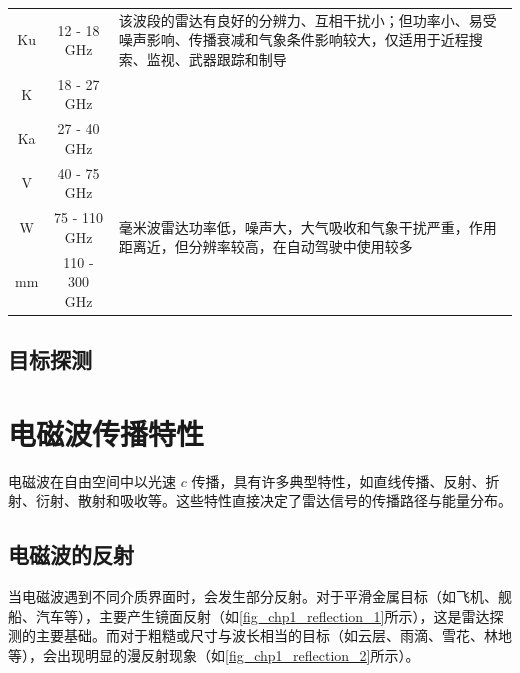 \begin{table}[htb!]
\begin{tabular}{c|c|p{7cm}}
        \hline
        Ku   & 12 - 18 GHz    & \multirow{1}{7cm}{该波段的雷达有良好的分辨力、互相干扰小；但功率小、易受噪声影响、传播衰减和气象条件影响较大，仅适用于近程搜索、监视、武器跟踪和制导}                           \\
        \cline{1-2}
        K    & 18 - 27 GHz    &                                                                                                                \\
        \cline{1-2}
        Ka   & 27 - 40 GHz    &                                                                                                                \\
        \hline
        V    & 40 - 75 GHz    & \multirow{3}{7cm}{毫米波雷达功率低，噪声大，大气吸收和气象干扰严重，作用距离近，但分辨率较高，在自动驾驶中使用较多}                                            \\
        \cline{1-2}
        W    & 75 - 110 GHz   &                                                                                                                \\
        \cline{1-2}
        mm   & 110 - 300 GHz  &                                                                                                                \\
        \hline
    \end{tabular}
\end{table}

\subsection{目标探测}


\section{电磁波传播特性}

电磁波在自由空间中以光速 $c$ 传播，具有许多典型特性，如直线传播、反射、折射、衍射、散射和吸收等。这些特性直接决定了雷达信号的传播路径与能量分布。

\subsection{电磁波的反射}

当电磁波遇到不同介质界面时，会发生部分反射。对于平滑金属目标（如飞机、舰船、汽车等），主要产生镜面反射（如\cref{fig_chp1_reflection_1}所示），这是雷达探测的主要基础。而对于粗糙或尺寸与波长相当的目标（如云层、雨滴、雪花、林地等），会出现明显的漫反射现象（如\cref{fig_chp1_reflection_2}所示）。

